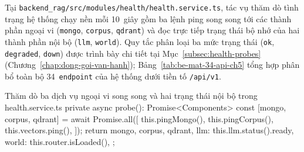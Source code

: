 Tại \texttt{backend\_\allowbreak{}rag/\allowbreak{}src/\allowbreak{}modules/\allowbreak{}health/\allowbreak{}health.\allowbreak{}service.\allowbreak{}ts}, tác vụ thăm dò tình trạng hệ thống chạy nền mỗi 10~giây gồm ba lệnh ping song song tới các thành phần ngoại vi (\texttt{mongo}, \texttt{corpus}, \texttt{qdrant}) và đọc trực tiếp trạng thái bộ nhớ của hai thành phần nội bộ (\texttt{llm}, \texttt{world}). Quy tắc phân loại ba mức trạng thái (\texttt{ok}, \texttt{degraded}, \texttt{down}) được trình bày chi tiết tại Mục~\ref{subsec:health-probes} (Chương~\ref{chap:dong-goi-van-hanh}); Bảng~\ref{tab:be-mat-34-api-ch5} tổng hợp phân bổ toàn bộ 34~\texttt{endpoint} của hệ thống dưới tiền tố \texttt{/api/v1}.

\begin{tsbox}{Thăm dò ba dịch vụ ngoại vi song song và hai trạng thái nội bộ trong health.service.ts}
private async probe(): Promise<Components> {
  const [mongo, corpus, qdrant] = await Promise.all([
    this.pingMongo(),
    this.pingCorpus(),
    this.vectors.ping(),
  ]);
  return {
    mongo,
    corpus,
    qdrant,
    llm: this.llm.status().ready,
    world: this.router.isLoaded(),
  };
}
\end{tsbox}

